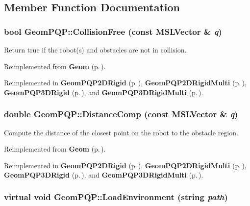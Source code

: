 \subsection{Member Function Documentation}
\subsubsection{\setlength{\rightskip}{0pt plus 5cm}bool Geom\-PQP::Collision\-Free (const {\bf MSLVector} \& {\em q})\hspace{0.3cm}{\tt  [inline, virtual]}}\label{class_GeomPQP_a4}


Return true if the robot(s) and obstacles are not in collision.



Reimplemented from {\bf Geom} {\rm (p.\,\pageref{class_Geom_a2})}.

Reimplemented in {\bf Geom\-PQP2DRigid} {\rm (p.\,\pageref{class_GeomPQP2DRigid_a2})}, {\bf Geom\-PQP2DRigid\-Multi} {\rm (p.\,\pageref{class_GeomPQP2DRigidMulti_a2})}, {\bf Geom\-PQP3DRigid} {\rm (p.\,\pageref{class_GeomPQP3DRigid_a2})}, and {\bf Geom\-PQP3DRigid\-Multi} {\rm (p.\,\pageref{class_GeomPQP3DRigidMulti_a2})}.
\subsubsection{\setlength{\rightskip}{0pt plus 5cm}double Geom\-PQP::Distance\-Comp (const {\bf MSLVector} \& {\em q})\hspace{0.3cm}{\tt  [inline, virtual]}}\label{class_GeomPQP_a5}


Compute the distance of the closest point on the robot to the obstacle region.



Reimplemented from {\bf Geom} {\rm (p.\,\pageref{class_Geom_a3})}.

Reimplemented in {\bf Geom\-PQP2DRigid} {\rm (p.\,\pageref{class_GeomPQP2DRigid_a3})}, {\bf Geom\-PQP2DRigid\-Multi} {\rm (p.\,\pageref{class_GeomPQP2DRigidMulti_a3})}, {\bf Geom\-PQP3DRigid} {\rm (p.\,\pageref{class_GeomPQP3DRigid_a3})}, and {\bf Geom\-PQP3DRigid\-Multi} {\rm (p.\,\pageref{class_GeomPQP3DRigidMulti_a3})}.
\subsubsection{\setlength{\rightskip}{0pt plus 5cm}virtual void Geom\-PQP::Load\-Environment (string {\em path})\hspace{0.3cm}{\tt  [virtual]}}\label{class_GeomPQP_a2}




